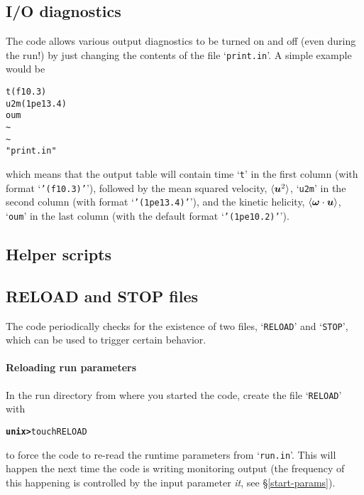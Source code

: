 \documentclass[12pt,twoside,notitlepage,a4paper]{article}
\makeatletter
\newcommand{\prompt}[1]{{\ttfamily\bfseries{}#1}}
\newcommand{\var}[1]{\textsl{#1}\index{#1@\emph{#1}}\/}
\newcommand{\file}[1]{`\texttt{#1}'}
\newcommand{\uu}{\mbox{\boldmath $u$} {}}
\newcommand{\oo}{\mbox{\boldmath $\omega$} {}}
\newcommand{\bra}[1]{\langle #1\rangle}
\makeatother
\begin{document}
\subsection{I/O diagnostics}

The code allows various output diagnostics to be turned on and off
(even during the run!) by just changing the contents of the file
\file{print.in}. A simple example would be\\

\begin{verbatim}
t(f10.3)
u2m(1pe13.4)
oum
~
~
"print.in"
\end{verbatim}
\vspace{1em}

\noindent
which means that the output table will contain time \file{t} in the first
column (with format \file{'(f10.3)'}), followed by the mean squared velocity,
$\bra{\uu^2}$, \file{u2m} in the second column (with format \file{'(1pe13.4)'}),
and the kinetic helicity, $\bra{\oo\cdot\uu}$,  \file{oum} in the last column
(with the default format \file{'(1pe10.2)'}).

\subsection{Helper scripts}

\subsection{RELOAD and STOP files}

The code periodically checks for the existence of two files, \file{RELOAD}
and \file{STOP}, which can be used to trigger certain behavior.

\paragraph{Reloading run parameters}
In the run directory from where you started the code, create the file
\file{RELOAD} with
\begin{alltt}
  \prompt{unix> } touch RELOAD \
\end{alltt}
to force the code to re-read the runtime parameters from \file{run.in}.
This will happen the next time the code is writing monitoring output (the
frequency of this happening is controlled by the input parameter \var{it},
see \S\ref{start-params}).
\end{document}
